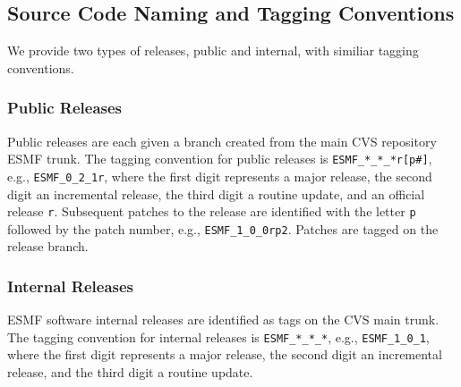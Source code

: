 
\subsection{Source Code Naming and Tagging Conventions}
\label{sec:tagging}

We provide two types of releases, public and internal, with similiar tagging conventions.

\subsubsection{Public Releases}
Public releases are each given a branch created from the main CVS repository ESMF trunk. The tagging convention
for public releases is
{\tt ESMF\_*\_*\_*r[p\#]}, e.g., {\tt ESMF\_0\_2\_1r}, where the first digit represents a major release, the
second digit an incremental release, the third digit a routine update, and an official release {\tt r}.
Subsequent patches to the release are identified with the letter {\tt p} followed by the patch number,
e.g., {\tt ESMF\_1\_0\_0rp2}. Patches are tagged on the release branch.

\subsubsection{Internal Releases}
ESMF software internal releases are identified as tags on the CVS main trunk.
The tagging convention for internal releases is
{\tt ESMF\_*\_*\_*}, e.g., {\tt ESMF\_1\_0\_1}, where the first digit represents a
major release, the second digit an incremental release, and the third digit a routine update.

